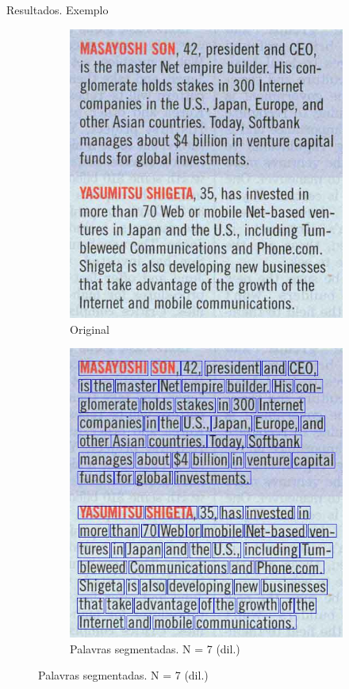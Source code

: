 \documentclass{beamer}
\begin{document}
\begin{frame}[allowframebreaks]{Resultados. Exemplo}
\begin{figure}
    \centering
    \begin{subfigure}[]{0.49\textwidth}
        \centering
        \includegraphics[width=\textwidth]{images/2.jpg}
        \caption{Original}
    \end{subfigure}
    \begin{subfigure}[]{0.49\textwidth}
        \centering
        \includegraphics[width=\textwidth]{images/2_words_7_01.jpg}
        \caption{Palavras segmentadas. N = 7 (dil.)}
    \end{subfigure}
\end{figure}


\end{frame}
\end{document}
